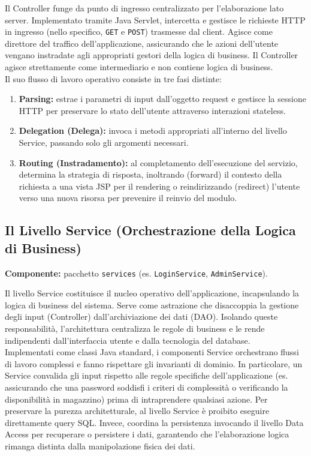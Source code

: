 \noindent Il Controller funge da punto di ingresso centralizzato per l'elaborazione lato server. Implementato tramite Java Servlet, intercetta e gestisce le richieste HTTP in ingresso (nello specifico, \texttt{GET} e \texttt{POST}) trasmesse dal client. Agisce come direttore del traffico dell'applicazione, assicurando che le azioni dell'utente vengano instradate agli appropriati gestori della logica di business. Il Controller agisce strettamente come intermediario e non contiene logica di business.\\

Il suo flusso di lavoro operativo consiste in tre fasi distinte:
\begin{enumerate}
	\item \textbf{Parsing:} estrae i parametri di input dall'oggetto request e gestisce la sessione HTTP per preservare lo stato dell'utente attraverso interazioni stateless.
	\item \textbf{Delegation (Delega):} invoca i metodi appropriati all'interno del livello Service, passando solo gli argomenti necessari.
	\item \textbf{Routing (Instradamento):} al completamento dell'esecuzione del servizio, determina la strategia di risposta, inoltrando (forward) il contesto della richiesta a una vista JSP per il rendering o reindirizzando (redirect) l'utente verso una nuova risorsa per prevenire il reinvio del modulo.
\end{enumerate}

\subsection{Il Livello Service (Orchestrazione della Logica di Business)}
\noindent\textbf{Componente:} pacchetto \texttt{services} (es. \texttt{LoginService}, \texttt{AdminService}).

\noindent Il livello Service costituisce il nucleo operativo dell'applicazione, incapsulando la logica di business del sistema. Serve come astrazione che disaccoppia la gestione degli input (Controller) dall'archiviazione dei dati (DAO). Isolando queste responsabilità, l'architettura centralizza le regole di business e le rende indipendenti dall'interfaccia utente e dalla tecnologia del database.\\

Implementati come classi Java standard, i componenti Service orchestrano flussi di lavoro complessi e fanno rispettare gli invarianti di dominio. In particolare, un Service convalida gli input rispetto alle regole specifiche dell'applicazione (es. assicurando che una password soddisfi i criteri di complessità o verificando la disponibilità in magazzino) prima di intraprendere qualsiasi azione. Per preservare la purezza architetturale, al livello Service è proibito eseguire direttamente query SQL. Invece, coordina la persistenza invocando il livello Data Access per recuperare o persistere i dati, garantendo che l'elaborazione logica rimanga distinta dalla manipolazione fisica dei dati.

